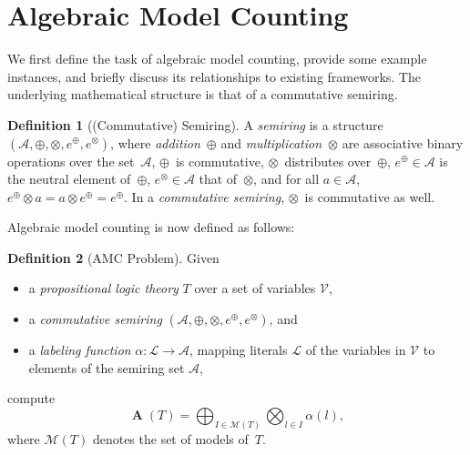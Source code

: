 \documentclass{article}
\theoremstyle{plain}
\theoremstyle{definition}
\newtheorem{definition}{Definition}
\begin{document}
\section{Algebraic Model Counting}\label{sec:amc}
We first define the task of algebraic model counting, provide some example
instances, and briefly discuss
its relationships to existing frameworks. The underlying mathematical structure is that of a
commutative semiring. 
\begin{definition}[(Commutative) Semiring]
A \emph{semiring} is a structure\linebreak[4] $(\mathcal{A}, \oplus, \otimes, 
e^{\oplus}, e^{\otimes})$, where \emph{addition}~$\oplus$ and
\emph{multiplication}~$\otimes$ are associative binary operations over
the set~$\mathcal{A}$, $\oplus$~is commutative, $\otimes$~distributes
over~$\oplus$, $e^{\oplus}\in\mathcal{A}$ is the neutral element of~$\oplus$, $e^{\otimes}\in\mathcal{A}$ that of~$\otimes$,
and for all $a\in \mathcal{A}$, $e^{\oplus}\otimes a = a \otimes
e^{\oplus} = e^{\oplus}$. In a \emph{commutative semiring}, $\otimes$~is
commutative as well.
\end{definition}
Algebraic model counting is now defined as follows:
\begin{definition}[AMC Problem]
Given
\begin{itemize}
  \item a \emph{propositional logic theory} $T$ over a set of
    variables $\mathcal{V}$, 
  \item a \emph{commutative semiring} $(\mathcal{A},\oplus,\otimes,   e^{\oplus},e^{\otimes})$, and 
 \item a \emph{labeling function} $\alpha : \mathcal{L} \rightarrow \mathcal{A}$, mapping literals $\mathcal{L}$ of the variables in $\mathcal{V}$ to elements of the semiring set $\mathcal{A}$, 
\end{itemize}
compute
\begin{equation} \label{eq:amc}
\operatorname{\mathbf{A}}(T)  = \bigoplus_{I\in \mathcal{M}(T)} \bigotimes_{l \in I} \alpha(l),
\end{equation}
where $\mathcal{M}(T)$ denotes the set of models of~$T$.
\end{definition}
\end{document}
